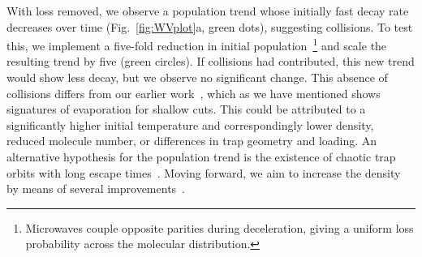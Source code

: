 \documentclass[%
 reprint,
 amsmath,amssymb,
 aps,
prl,
]{revtex4-1}
\newcommand{\bcl}{{$B_\text{coil}$}}
\begin{document}
%


With loss removed, we observe a population trend whose initially fast decay rate decreases over time (Fig.~\ref{fig:WVplot}a, green dots), suggesting collisions. 
To test this, we implement a five-fold reduction in initial population~\footnote{Microwaves couple opposite parities during deceleration, giving a uniform loss probability across the molecular distribution.} and scale the resulting trend by five (green circles). 
If collisions had contributed, this new trend would show less decay, but we observe no significant change. 
This absence of collisions differs from our earlier work~\cite{Stuhl2012evap}, which as we have mentioned shows signatures of evaporation for shallow cuts. 
This could be attributed to a significantly higher initial temperature and correspondingly lower density, reduced molecule number, or differences in trap geometry and loading. 
An alternative hypothesis for the population trend is the existence of chaotic trap orbits with long escape times~\cite{Gonzalez-Ferez2014}.
Moving forward, we aim to increase the density by means of several improvements~\cite{Even2015,Segev2017}.
\end{document}
